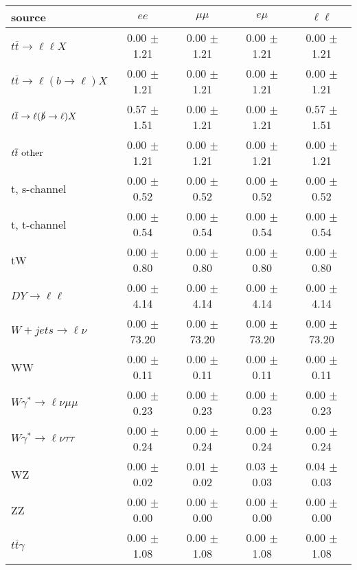 \begin{tabular}{l|cccc} \hline\hline
source & $ee$ & $\mu\mu$ & $e\mu$ & $\ell\ell $ \\
\hline
$t\overline{t} \rightarrow \ell \ell X$ &  0.00 $\pm$  1.21 &  0.00 $\pm$  1.21 &  0.00 $\pm$  1.21 &  0.00 $\pm$  1.21 \\
$t\overline{t} \rightarrow \ell (b \rightarrow \ell) X$ &  0.00 $\pm$  1.21 &  0.00 $\pm$  1.21 &  0.00 $\pm$  1.21 &  0.00 $\pm$  1.21 \\
$t\overline{t} \rightarrow \ell (\slashed b \rightarrow \ell) X$ &  0.57 $\pm$  1.51 &  0.00 $\pm$  1.21 &  0.00 $\pm$  1.21 &  0.57 $\pm$  1.51 \\
        $t\overline{t}\ \rm{other}$ &  0.00 $\pm$  1.21 &  0.00 $\pm$  1.21 &  0.00 $\pm$  1.21 &  0.00 $\pm$  1.21 \\
\hline
                       t, s-channel &  0.00 $\pm$  0.52 &  0.00 $\pm$  0.52 &  0.00 $\pm$  0.52 &  0.00 $\pm$  0.52 \\
                       t, t-channel &  0.00 $\pm$  0.54 &  0.00 $\pm$  0.54 &  0.00 $\pm$  0.54 &  0.00 $\pm$  0.54 \\
                                 tW &  0.00 $\pm$  0.80 &  0.00 $\pm$  0.80 &  0.00 $\pm$  0.80 &  0.00 $\pm$  0.80 \\
\hline
         $DY \rightarrow \ell \ell$ &  0.00 $\pm$  4.14 &  0.00 $\pm$  4.14 &  0.00 $\pm$  4.14 &  0.00 $\pm$  4.14 \\
      $W+jets \rightarrow \ell \nu$ &  0.00 $\pm$ 73.20 &  0.00 $\pm$ 73.20 &  0.00 $\pm$ 73.20 &  0.00 $\pm$ 73.20 \\
                                 WW &  0.00 $\pm$  0.11 &  0.00 $\pm$  0.11 &  0.00 $\pm$  0.11 &  0.00 $\pm$  0.11 \\
\hline
$W\gamma^{*} \rightarrow \ell \nu \mu\mu$ &  0.00 $\pm$  0.23 &  0.00 $\pm$  0.23 &  0.00 $\pm$  0.23 &  0.00 $\pm$  0.23 \\
$W\gamma^{*} \rightarrow \ell \nu \tau\tau$ &  0.00 $\pm$  0.24 &  0.00 $\pm$  0.24 &  0.00 $\pm$  0.24 &  0.00 $\pm$  0.24 \\
                                 WZ &  0.00 $\pm$  0.02 &  0.01 $\pm$  0.02 &  0.03 $\pm$  0.03 &  0.04 $\pm$  0.03 \\
                                 ZZ &  0.00 $\pm$  0.00 &  0.00 $\pm$  0.00 &  0.00 $\pm$  0.00 &  0.00 $\pm$  0.00 \\
\hline
              $t\overline{t}\gamma$ &  0.00 $\pm$  1.08 &  0.00 $\pm$  1.08 &  0.00 $\pm$  1.08 &  0.00 $\pm$  1.08 \\

\end{tabular}
